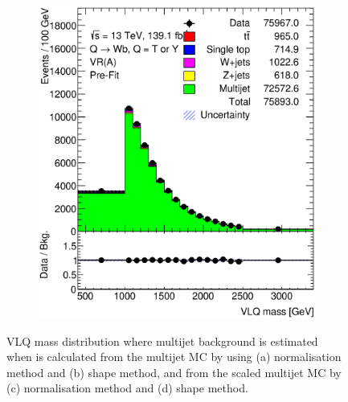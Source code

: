 \begin{figure}[hbt!]
\begin{subfigure}{.35\textwidth}
		\caption{}
		\label{fig:abcd:furtherimprovement:scaledcorr:postfit:integral:VLQM}
	\end{subfigure}\hspace{0.6cm}
	\begin{subfigure}{.35\textwidth}
		\centering
		\includegraphics[width=\linewidth,height=\textheight,keepaspectratio]{figs/chapter5/postfitbinbybin/VR_B_VLQM.eps}
		\caption{}
		\label{fig:abcd:furtherimprovement:scaledcorr:postfit:bin:VLQM}
	\end{subfigure}
	\caption{VLQ mass distribution where multijet background is estimated when \R is calculated from the multijet MC by using (a) normalisation method and (b) shape method, and from the scaled multijet MC by (c) normalisation method and (d) shape method.}
	\label{fig:abcd:furtherimprovement:scaledcorr:VLQM}
\end{figure}


